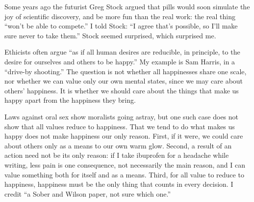 
Some years ago the futurist Greg Stock argued that pills would soon simulate the joy of scientific discovery, and be more fun than the real work: the real thing ``won't be able to compete.'' I told Stock: ``I agree that's possible, so I'll make sure never to take them.'' Stock seemed surprised, which surprised me.

Ethicists often argue ``as if all human desires are reducible, in principle, to the desire for ourselves and others to be happy.'' My example is Sam Harris, in a ``drive-by shooting.''  The question is not whether all happinesses share one scale, nor whether we can value only our own mental states, since we may care about others' happiness. It is whether we should care about the things that make us happy apart from the happiness they bring.

Laws against oral sex show moralists going astray, but one such case does not show that all values reduce to happiness. That we tend to do what makes us happy does not make happiness our only reason. First, if it were, we could care about others only as a means to our own warm glow.  Second, a result of an action need not be its only reason: if I take ibuprofen for a headache while writing, less pain is one consequence, not necessarily the main reason, and I can value something both for itself and as a means. Third, for all value to reduce to happiness, happiness must be the only thing that counts in every decision. I credit ``a Sober and Wilson paper, not sure which one.'' 

